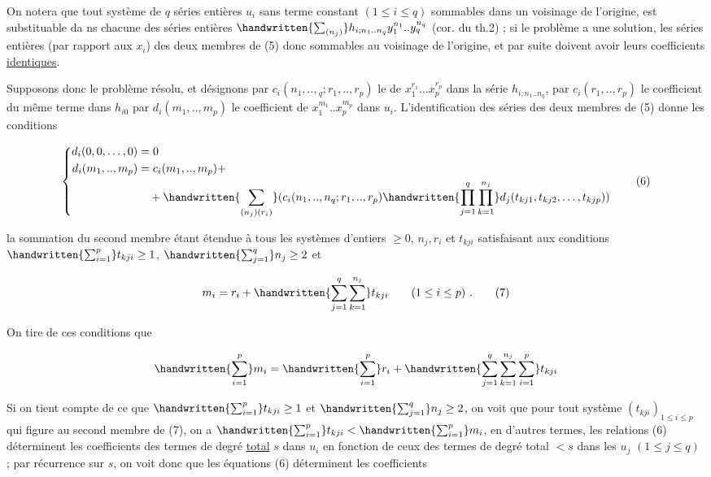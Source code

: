 
On notera que tout système de $q$ séries entières $u_i$ sans terme constant $(1\leq i\leq q)$ sommables dans un voisinage de l'origine, est substituable da ns chacune des séries entières $\handwritten{\sum_{(n_j)}}h_{i;n_1..n_q}y_1^{n_1}..y_q^{n_q}$ (cor. du th.2) ; si le problème a une solution, les séries entières (par rapport aux $x_i$) des deux membres de (5)  donc sommables au voisinage de l'origine, et par suite doivent a\unsure{-|{}}voir leurs coefficients \uline{identiques}.

Supposons donc le problème résolu, et désignons par $c_i(n_1,..,{}_{q};r_1,..,r_p)$ le  de $x_1^{r_1}\ldots x_p^{r_p}$ dans la série $h_{i;n_1..n_q}$, par $c_i(r_1,..,r_p)$ le coefficient du même terme dans $h_{i0}$ par $d_i(m_1,..,m_p)$ le coefficient de $x_1^{m_1}..x_p^{m_p}$ dans $u_i$. L'identification des séries des deux membres de (5) donne les conditions

\[
\left\{\begin{aligned}
d_i(0,0,\ldots,0)&=0\\
d_i(m_1,..,m_p)&=c_i(m_1,..,m_p)+\\
&\quad+\handwritten{\sum_{(n_j)(r_i)}}(c_i(n_1,..,n_q;r_1,..,r_p)
\handwritten{\prod_{j=1}^q\prod_{k=1}^{n_j}}d_j(t_{kj1},t_{kj2},\ldots,t_{kjp}))
\end{aligned}\right.\tag*{(6)}
\]

la sommation du second membre étant étendue à tous les systèmes d'entiers $\geq 0$, $n_j,r_i$ et $t_{kji}$ satisfaisant aux conditions $\handwritten{\sum_{i=1}^{p}}t_{kji}\geq 1$, $\handwritten{\sum_{j=1}^q}n_j\geq 2$ et

\[
m_i=r_i+\handwritten{\sum_{j=1}^{q}\sum_{k=1}^{n_j}}t_{kji}\qquad(1\leq i\leq p)\ .\tag*{(7)}
\]

On tire de ces conditions que

\[
\handwritten{\sum_{i=1}^{p}}m_i=\handwritten{\sum_{i=1}^{p}}r_i+
\handwritten{\sum_{j=1}^{q}\sum_{k=1}^{n_j}\sum_{i=1}^{p}}t_{kji}
\]

Si on tient compte de ce que $\handwritten{\sum_{i=1}^p}t_{kji}\geq 1$ et $\handwritten{\sum_{j=1}^{q}}n_j\geq 2$, on voit que pour tout système $(t_{kji})_{1\leq i\leq p}$ qui figure au second membre de (7), on a $\handwritten{\sum_{i=1}^p}t_{kji}<\handwritten{\sum_{i=1}^{p}}m_i$, en d'autres termes, les relations (6) déterminent les coefficients des termes de degré \uline{total} $s$ dans $u_i$ en fonction de ceux des termes de degré total $<s$ dans les $u_j$ $(1\leq j\leq q)$ ; par récurrence sur $s$, on voit donc que les équations (6) déterminent les coefficients

